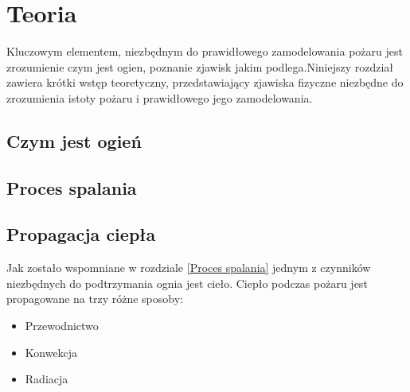 ﻿\chapter{Teoria}
\label{cha:Teoria}
Kluczowym elementem, niezbędnym do prawidłowego zamodelowania pożaru
jest zrozumienie czym jest ogien, poznanie zjawisk jakim podlega.Niniejszy rozdział zawiera
krótki wstęp teoretyczny, przedstawiający zjawiska fizyczne niezbędne do zrozumienia istoty 
pożaru i prawidłowego jego zamodelowania.
\section {Czym jest ogień}
\section {Proces spalania}
\section {Propagacja ciepła}
Jak zostało wspomniane w rozdziale \ref{Proces spalania} jednym z czynników niezbędnych
do podtrzymania ognia jest cieło. Ciepło podczas pożaru jest propagowane na trzy różne sposoby:
\begin {itemize}
\item Przewodnictwo
\item Konwekcja
\item Radiacja
\end {itemize}


